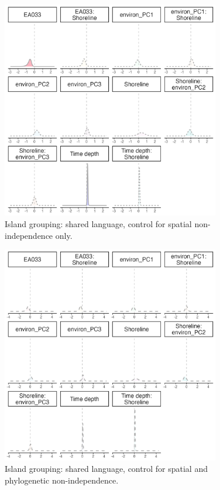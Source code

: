 \documentclass[unnumsec,webpdf,modern,medium]{oup-authoring-template}
\begin{document}
\begin{figure}[ht]
\includegraphics[width=0.85\textwidth]{brms_medium_control_spatial_group_full_effect_ridge_panels_plot.png}
\caption{Island grouping: shared language, control for spatial non-independence only. }
\label{brms_medium_control_spatial_group_full_effect_ridge_panels_plot}
\end{figure}

\begin{figure}[ht]
\includegraphics[width=0.85\textwidth]{brms_medium_control_spatialphylo_group_full_effect_ridge_panels_plot.png}
\caption{Island grouping: shared language, control for spatial and phylogenetic non-independence.}
\label{brms_medium_control_spatialphylo_group_full_effect_ridge_panels_plot}
\end{figure}
\end{document}
